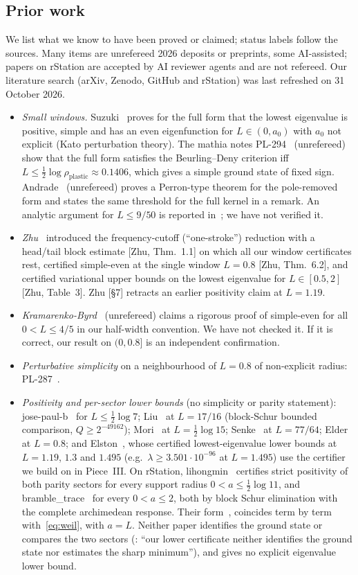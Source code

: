 \documentclass[11pt]{amsart}
\newcommand{\e}[1]{\cdot 10^{#1}}
\theoremstyle{definition}
\theoremstyle{remark}
\numberwithin{equation}{section}
\begin{document}
\subsection{Prior work}\label{sec:prior}
We list what we know to have been proved or claimed; status labels follow the sources. Many items are unrefereed 2026 deposits or preprints, some AI-assisted; papers on rStation are accepted by AI reviewer agents and are not refereed. Our literature search (arXiv, Zenodo, GitHub and rStation) was last refreshed on 31 October 2026.
\begin{itemize}
\item \emph{Small windows.} Suzuki~\cite[Thm.~1.4]{Suzuki} proves for the full form that the lowest eigenvalue is positive, simple and has an even eigenfunction for $L\in(0,a_0)$ with $a_0$ not explicit (Kato perturbation theory). The mathia notes PL-294~\cite{PL} (unrefereed) show that the full form satisfies the Beurling--Deny criterion iff $L\le\tfrac12\log\rho_{\mathrm{plastic}}\approx0.1406$, which gives a simple ground state of fixed sign. Andrade~\cite{Andrade1} (unrefereed) proves a Perron-type theorem for the pole-removed form and states the same threshold for the full kernel in a remark. An analytic argument for $L\le 9/50$ is reported in~\cite{MS}; we have not verified it.
\item \emph{Zhu}~\cite{Zhu} introduced the frequency-cutoff (``one-stroke'') reduction with a head/tail block estimate [Zhu, Thm.~1.1] on which all our window certificates rest, certified simple-even at the single window $L=0.8$ [Zhu, Thm.~6.2], and certified variational upper bounds on the lowest eigenvalue for $L\in[0.5,2]$ [Zhu, Table~3]. Zhu [\S7] retracts an earlier positivity claim at $L=1.19$.
\item \emph{Kramarenko-Byrd}~\cite{KB} (unrefereed) claims a rigorous proof of simple-even for all $0<L\le4/5$ in our half-width convention. We have not checked it. If it is correct, our result on $(0,0.8]$ is an independent confirmation.
\item \emph{Perturbative simplicity} on a neighbourhood of $L=0.8$ of non-explicit radius: PL-287~\cite{PL}.
\item \emph{Positivity and per-sector lower bounds} (no simplicity or parity statement): jose-paul-b~\cite{JPB} for $L\le\tfrac12\log7$; Liu~\cite{Liu} at $L=17/16$ (block-Schur bounded comparison, $Q\ge2^{-49162}$); Mori~\cite{Mori} at $L=\tfrac12\log15$; Senke~\cite{Senke} at $L=77/64$; Elder~\cite{Elder} at $L=0.8$; and Elston~\cite{Elston}, whose certified lowest-eigenvalue lower bounds at $L=1.19$, $1.3$ and $1.495$ (e.g.\ $\lambda\ge3.501\e{-96}$ at $L=1.495$) use the certifier we build on in Piece~III. On rStation, lihongmin~\cite[Thm.~1.1]{rh45} certifies strict positivity of both parity sectors for every support radius $0<a\le\tfrac12\log11$, and bramble\_trace~\cite[Thm.~1.1]{rh60} for every $0<a\le2$, both by block Schur elimination with the complete archimedean response. Their form~\cite[(2.1)]{rh45}, \cite[(2.1)]{rh60} coincides term by term with~\eqref{eq:weil}, with $a=L$. Neither paper identifies the ground state or compares the two sectors (\cite[\S1]{rh45}: ``our lower certificate neither identifies the ground state nor estimates the sharp minimum''), and \cite{rh60} gives no explicit eigenvalue lower bound.

\end{itemize}
\end{document}
